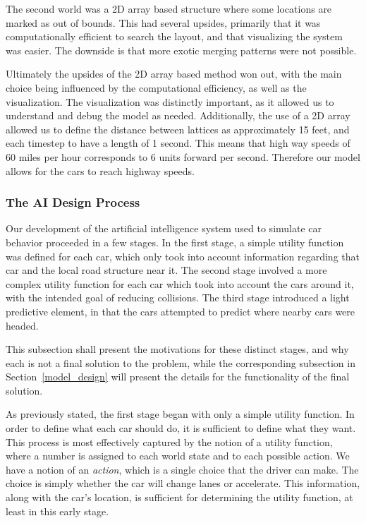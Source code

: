 \documentclass[a4paper, 11pt]{article}
\begin{document}
The second world was a 2D array based structure where some locations are marked as out of bounds. This had several upsides, primarily that it was computationally efficient to search the layout, and that visualizing the system was easier. The downside is that more exotic merging patterns were not possible. 

Ultimately the upsides of the 2D array based method won out, with the main choice being influenced by the computational efficiency, as well as the visualization. The visualization was distinctly important, as it allowed us to understand and debug the model as needed. Additionally, the use of a 2D array allowed us to define the distance between lattices as approximately 15 feet, and each timestep to have a length of 1 second. This means that high way speeds of 60 miles per hour corresponds to 6 units forward per second. Therefore our model allows for the cars to reach highway speeds. 


\subsubsection{The AI Design Process}
\label{ai_design}
Our development of the artificial intelligence system used to simulate car behavior proceeded in a few stages. In the first stage,
a simple utility function was defined for each car, which only took into account information regarding that car and 
the local road structure near it. The second stage involved a more complex utility function for each car which took into account the cars around it, 
with the intended goal of reducing collisions. The third stage introduced a light predictive element, in that the cars attempted to 
predict where nearby cars were headed. 

This subsection shall present the motivations for these distinct stages, and why each is not a final solution to the problem, 
while the corresponding subsection in Section~\ref{model_design} will present the details for the functionality of the final solution.  

As previously stated, the first stage began with only a simple utility function. 
In order to define what each car should do, it is sufficient to define what they want. This process is most effectively 
captured by the notion of a utility function, where a number is assigned to each world state and to each possible action.
We have a notion of an \textit{action}, which is a single choice that the driver can make. 
The choice is simply whether the car will change lanes or accelerate.
This information, along with the car's location, is sufficient for determining the utility function, 
at least in this early stage. 
\end{document}
